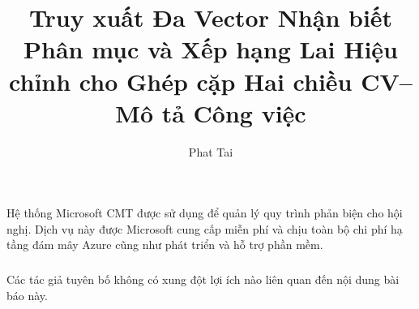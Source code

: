 \documentclass[runningheads]{llncs}
\begin{document}
\title{Truy xuất Đa Vector Nhận biết Phân mục và Xếp hạng Lai Hiệu chỉnh cho Ghép cặp Hai chiều CV--Mô tả Công việc}


\author{Phat Tai}


\maketitle










\begin{credits}
\subsubsection{\ackname}
Hệ thống Microsoft CMT được sử dụng để quản lý quy trình phản biện cho hội nghị. Dịch vụ này được Microsoft cung cấp miễn phí và chịu toàn bộ chi phí hạ tầng đám mây Azure cũng như phát triển và hỗ trợ phần mềm.

\subsubsection{\discintname}
Các tác giả tuyên bố không có xung đột lợi ích nào liên quan đến nội dung bài báo này.
\end{credits}



\end{document}

